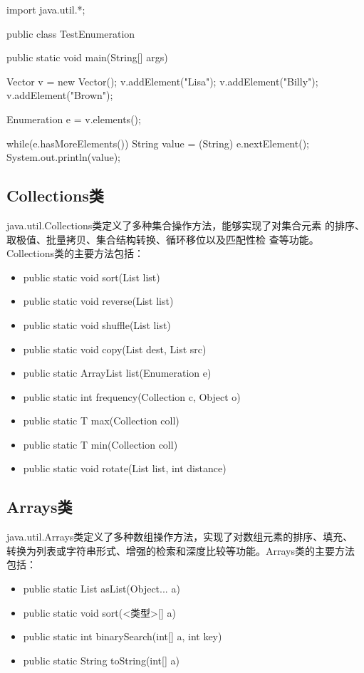 \begin{javaCode}
  import java.util.*;

  public class TestEnumeration {
    public static void main(String[] args) {
      Vector v = new Vector();
      v.addElement("Lisa");
      v.addElement("Billy");
      v.addElement("Brown");

      Enumeration e = v.elements();

      while(e.hasMoreElements()) {
        String value = (String) e.nextElement();
        System.out.println(value);
      }
    }
  }
\end{javaCode}

\subsection{Collections类}

java.util.Collections类定义了多种集合操作方法，能够实现了对集合元素
的{\Blue\hei 排序、取极值、批量拷贝、集合结构转换、循环移位以及匹配性检
  查}等功能。Collections类的主要方法包括：

\begin{itemize}\small
\item public static void sort(List list)
\item public static void reverse(List list)
\item public static void shuffle(List list)
\item public static void copy(List dest, List src)
\item public static ArrayList list(Enumeration e)
\item public static int frequency(Collection c, Object o)
\item public static T max(Collection coll)
\item public static T min(Collection coll)
\item public static void rotate(List list, int distance)
\end{itemize}

\subsection{Arrays类}

java.util.Arrays类定义了多种数组操作方法，实现了对数组元素的排序、填充、
转换为列表或字符串形式、增强的检索和深度比较等功能。Arrays类的主要方法
包括：

\begin{itemize}
\item public static List asList(Object... a)
\item public static void sort(<类型>[] a)
\item public static int binarySearch(int[] a, int key)
\item public static String toString(int[] a)
\end{itemize}

